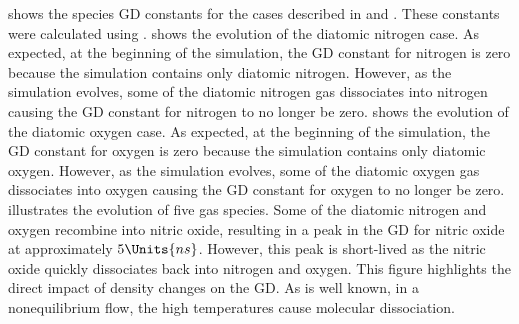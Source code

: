      shows the species
    \gls{GD} constants for the cases described in
     and
    . These constants were
    calculated using .  shows the evolution of the diatomic
    nitrogen case. As expected, at the beginning of the simulation, the
    \gls{GD} constant for nitrogen is
    zero because the simulation contains only diatomic nitrogen.
    However, as the simulation evolves, some of the diatomic nitrogen gas
    dissociates
    into nitrogen causing the \gls{GD} constant for nitrogen to no longer be
    zero.  shows the evolution of the diatomic
    oxygen case. As expected, at the beginning of the simulation, the
    \gls{GD} constant for oxygen is
    zero because the simulation contains only diatomic oxygen.
    However, as the simulation evolves, some of the diatomic oxygen gas
    dissociates
    into oxygen causing the \gls{GD} constant for oxygen to no longer be
    zero.  illustrates the evolution of five
    gas species. Some of the diatomic nitrogen and oxygen recombine into nitric
    oxide, resulting in a peak in the \gls{GD} for nitric oxide at
    approximately $5\Units{ns}$. However, this peak is short-lived as the
    nitric oxide quickly dissociates back into nitrogen and oxygen. This figure
    highlights the direct impact of density changes on the \gls{GD}. As is well
    known, in a nonequilibrium flow, the high temperatures cause molecular
    dissociation. 
